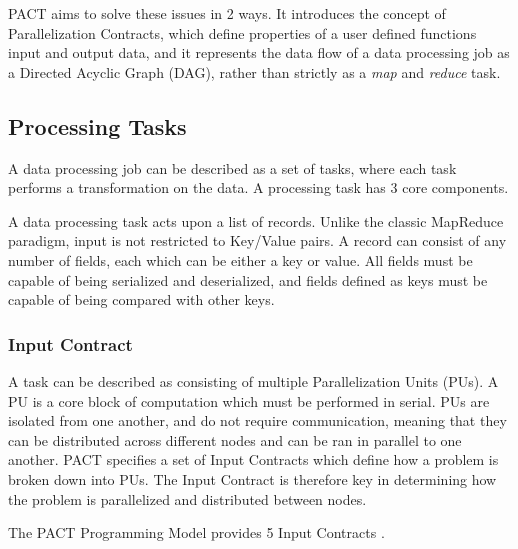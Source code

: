 PACT aims to solve these issues in 2 ways. It introduces the concept of Parallelization Contracts, which define properties of a user defined functions input and output data, and it represents the data flow of a data processing job as a Directed Acyclic Graph (DAG), rather than strictly as a \textit{map} and \textit{reduce} task.

\subsection{Processing Tasks}
A data processing job can be described as a set of tasks, where each task performs a transformation on the data. A processing task has 3 core components.

A data processing task acts upon a list of records. Unlike the classic MapReduce paradigm, input is not restricted to Key/Value pairs. A record can consist of any number of fields, each which can be either a key or value. All fields must be capable of being serialized and deserialized, and fields defined as keys must be capable of being compared with other keys. 

\subsubsection{Input Contract} 
A task can be described as consisting of multiple Parallelization Units (PUs). A PU is a core block of computation which must be performed in serial. PUs are isolated from one another, and do not require communication, meaning that they can be distributed across different nodes and can be ran in parallel to one another. PACT specifies a set of Input Contracts which define how a problem is broken down into PUs. The Input Contract is therefore key in determining how the problem is parallelized and distributed between nodes.

The PACT Programming Model provides 5 Input Contracts \cite{alexandrov2010massively}.

